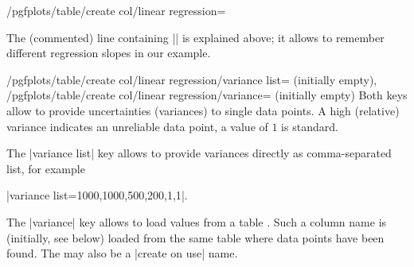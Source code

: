 {\begin{stylekey}{/pgfplots/table/create col/linear regression=}
\begin{keylist}
\begin{codeexample}[]
\end{codeexample}

        The (commented) line containing |\slope| is explained above; it allows
        to remember different regression slopes in our example.
    \end{keylist}

    \begin{keylist}{%
        /pgfplots/table/create col/linear regression/variance list= (initially empty),
        /pgfplots/table/create col/linear regression/variance= (initially empty)%
    }
        Both keys allow to provide uncertainties (variances) to single data
        points. A high (relative) variance indicates an unreliable data point,
        a value of $1$ is standard.

        The |variance list| key allows to provide variances directly as
        comma-separated list, for example

        |variance list={1000,1000,500,200,1,1}|.

        The |variance| key allows to load values from a table . Such a column name is (initially, see below) loaded from the
        same table where data points have been found. The 
        may also be a |create on use| name.
\begin{codeexample}[]
\end{codeexample}
\end{keylist}
\end{stylekey}}
